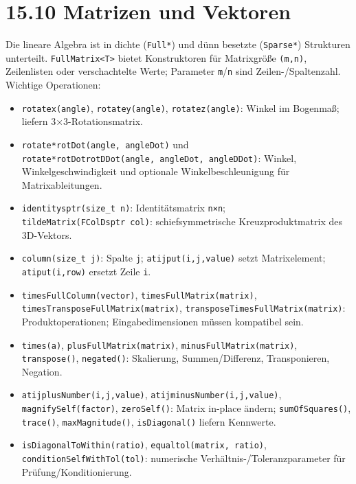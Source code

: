 \documentclass[
  12pt
]{book}
\providecommand{\tightlist}{%
  \setlength{\itemsep}{0pt}\setlength{\parskip}{0pt}}
\begin{document}
\hypertarget{abs-api-matrizen}{%
\section{\texorpdfstring{{15.10} Matrizen und
Vektoren}{15.10 Matrizen und Vektoren}}\label{abs-api-matrizen}}

Die lineare Algebra ist in dichte (\texttt{Full*}) und dünn besetzte
(\texttt{Sparse*}) Strukturen unterteilt.
\texttt{FullMatrix\textless{}T\textgreater{}} bietet Konstruktoren für
Matrixgröße \texttt{(m,n)}, Zeilenlisten oder verschachtelte Werte;
Parameter \texttt{m}/\texttt{n} sind Zeilen-/Spaltenzahl. Wichtige
Operationen:

\begin{itemize}
\tightlist
\item
  \texttt{rotatex(angle)}, \texttt{rotatey(angle)},
  \texttt{rotatez(angle)}: Winkel im Bogenmaß; liefern
  3×3-Rotationsmatrix.
\item
  \texttt{rotate*rotDot(angle,\ angleDot)} und
  \texttt{rotate*rotDotrotDDot(angle,\ angleDot,\ angleDDot)}: Winkel,
  Winkelgeschwindigkeit und optionale Winkelbeschleunigung für
  Matrixableitungen.
\item
  \texttt{identitysptr(size\_t\ n)}: Identitätsmatrix \texttt{n×n};
  \texttt{tildeMatrix(FColDsptr\ col)}: schiefsymmetrische
  Kreuzproduktmatrix des 3D-Vektors.
\item
  \texttt{column(size\_t\ j)}: Spalte \texttt{j};
  \texttt{atijput(i,j,value)} setzt Matrixelement;
  \texttt{atiput(i,row)} ersetzt Zeile \texttt{i}.
\item
  \texttt{timesFullColumn(vector)}, \texttt{timesFullMatrix(matrix)},
  \texttt{timesTransposeFullMatrix(matrix)},
  \texttt{transposeTimesFullMatrix(matrix)}: Produktoperationen;
  Eingabedimensionen müssen kompatibel sein.
\item
  \texttt{times(a)}, \texttt{plusFullMatrix(matrix)},
  \texttt{minusFullMatrix(matrix)}, \texttt{transpose()},
  \texttt{negated()}: Skalierung, Summen/Differenz, Transponieren,
  Negation.
\item
  \texttt{atijplusNumber(i,j,value)},
  \texttt{atijminusNumber(i,j,value)}, \texttt{magnifySelf(factor)},
  \texttt{zeroSelf()}: Matrix in-place ändern; \texttt{sumOfSquares()},
  \texttt{trace()}, \texttt{maxMagnitude()}, \texttt{isDiagonal()}
  liefern Kennwerte.
\item
  \texttt{isDiagonalToWithin(ratio)}, \texttt{equaltol(matrix,\ ratio)},
  \texttt{conditionSelfWithTol(tol)}: numerische
  Verhältnis-/Toleranzparameter für Prüfung/Konditionierung.
\end{itemize}
\end{document}
